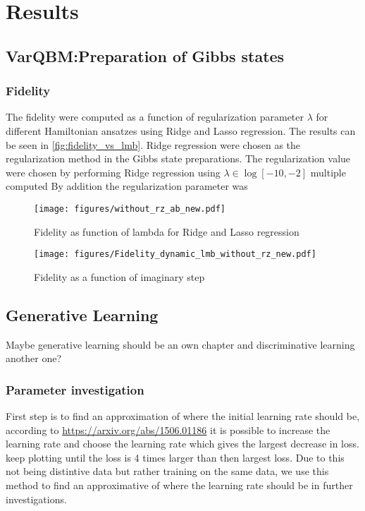 \documentclass[../main.tex]{subfiles}
\begin{document}
\chapter{Results}
\label{sec:seventh}

\section{VarQBM:Preparation of Gibbs states}
\subsection{Fidelity}
The fidelity were computed as a function of regularization parameter $\lambda$ for different Hamiltonian ansatzes using Ridge and Lasso regression. The results can be seen in \autoref{fig:fidelity_vs_lmb}. Ridge regression were chosen as the regularization method in the Gibbs state preparations. The regularization value were chosen by performing Ridge regression using $\lambda \in \log[-10,-2]$ multiple computed By addition the regularization parameter was 

\begin{figure}
    \begin{center}
        \texttt{[image: figures/without\_rz\_ab\_new.pdf]}
        \caption{Fidelity as function of lambda for Ridge and Lasso regression}
        \label{fig:fidelity_vs_lmb}
    \end{center}
\end{figure}


\begin{figure}
    \begin{center}
        \texttt{[image: figures/Fidelity\_dynamic\_lmb\_without\_rz\_new.pdf]}
        \caption{Fidelity as a function of imaginary step}
        \label{fig:nolabel}
    \end{center}
\end{figure}

\section{Generative Learning}
Maybe generative learning should be an own chapter and discriminative learning another one?

\subsection{Parameter investigation}

First step is to find an approximation of where the initial learning rate should be, according to \url{https://arxiv.org/abs/1506.01186} it is possible to increase the learning rate and choose the learning rate which gives the largest decrease in loss. keep plotting until the loss is 4 times larger than then largest loss. Due to this not being distintive data but rather training on the same data, we use this method to find an approximative of where the learning rate should be in further investigations.
\end{document}
